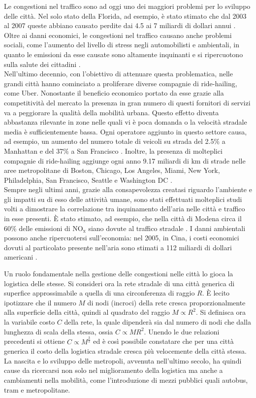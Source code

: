 \documentclass[../main.tex]{subfiles}
\begin{document}
Le congestioni nel traffico sono ad oggi uno dei maggiori problemi per lo sviluppo delle citt\`a.
Nel solo stato della Florida, ad esempio, \`e stato stimato che dal 2003 al 2007 queste abbiano causato perdite dai 4.5 ai 7 miliardi di dollari annui \cite{florida}.
Oltre ai danni economici, le congestioni nel traffico causano anche problemi sociali, come l'aumento del livello di stress negli automobilisti \cite{hennessy1999traffic} e ambientali, in quanto le emissioni da esse causate sono altamente inquinanti e si ripercuotono sulla salute dei cittadini \cite{zhang2013air}.\\
Nell'ultimo decennio, con l'obiettivo di attenuare questa problematica, nelle grandi citt\`a hanno cominciato a proliferare diverse compagnie di ride-hailing, come Uber.
Nonostante il beneficio economico portato da esse grazie alla competitivit\`a del mercato la presenza in gran numero di questi fornitori di servizi va a peggiorare la qualit\`a della mobilit\`a urbana.
Questo effetto diventa abbastanza rilevante in zone nelle quali vi \`e poca domanda o la velocit\`a stradale media \`e sufficientemente bassa.
Ogni operatore aggiunto in questo settore causa, ad esempio, un aumento del numero totale di veicoli su strada del 2.5\% a Manhattan e del 37\% a San Francisco \cite{Kondor2022}.
Inoltre, la presenza di molteplici compagnie di ride-hailing aggiunge ogni anno 9.17 miliardi di km di strade nelle aree metropolitane di Boston, Chicago, Los Angeles, Miami, New York, Philadelphia, San Francisco, Seattle e Washington DC \cite{schaller2018new}.\\
Sempre negli ultimi anni, grazie alla consapevolezza creatasi riguardo l'ambiente e gli impatti su di esso delle attivit\`a umane, sono stati effettuati molteplici studi volti a dimostrare la correlazione tra inquinamento dell'aria nelle citt\`a e traffico in esse presenti.
\`E stato stimato, ad esempio, che nella citt\`a di Modena circa il 60\% delle emissioni di NO$_\text{x}$ siano dovute al traffico stradale \cite{veratti2017mu}.
I danni ambientali possono anche ripercuotersi sull'economia: nel 2005, in Cina, i costi economici dovuti al particolato presente nell'aria sono stimati a 112 miliardi di dollari americani \cite{MATUS201255}.

Un ruolo fondamentale nella gestione delle congestioni nelle citt\`a lo gioca la logistica delle stesse.
Si consideri ora la rete stradale di una citt\`a generica di superfice approssimabile a quella di una circonferenza di raggio $R$.
\`E lecito ipotizzare che il numero $M$ di nodi (incroci) della rete cresca proporzionalmente alla superficie della citt\`a, quindi al quadrato del raggio $M\propto R^2$.
Si definisca ora la variabile costo $C$ della rete, la quale dipender\`a sia dal numero di nodi che dalla lunghezza di scala della stessa, ossia $C\propto MR^2$.
Unendo le due relazioni precedenti si ottiene $C\propto M^\frac{3}{2}$ ed \`e cos\`i possibile constatare che per una citt\`a generica il costo della logistica stradale cresca pi\`u velocemente della citt\`a stessa.
La nascita e lo sviluppo delle metropoli, avvenuta nell'ultimo secolo, ha quindi cause da ricercarsi non solo nel miglioramento della logistica ma anche a cambiamenti nella mobilit\`a, come l'introduzione di mezzi pubblici quali autobus, tram e metropolitane.
\end{document}
